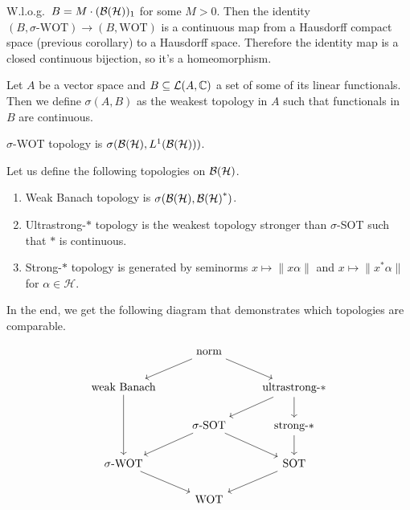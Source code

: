 \begin{myproof}
  W.l.o.g.~$B = M \cdot (\operatorname{\mathcal{B} (\mathcal{H})})_1$ for some $M > 0$. Then the identity $(B, \textrm{$\sigma$-WOT}) \to (B, \textrm{WOT})$
  is a continuous map from a Hausdorff compact space (previous corollary) to a Hausdorff space.
  Therefore the identity map is a closed continuous bijection, so it's a homeomorphism.
\end{myproof}

\begin{definition}
  Let $A$ be a vector space and $B \subseteq \mathcal{L} (A, \mathbb {C})$ a set of some of its linear functionals.
  Then we define $\sigma(A, B)$ as the weakest topology in $A$ such that functionals in $B$ are continuous. 
\end{definition}

\begin{remark}
  $\sigma$-WOT topology is $\sigma(\operatorname{\mathcal{B} (\mathcal{H})}, L^1 (\operatorname{\mathcal{B} (\mathcal{H})}))$.
\end{remark}

\begin{remark}
  Let us define the following topologies on $\operatorname{\mathcal{B} (\mathcal{H})}$.
  \begin{enumerate}
    \item Weak Banach topology is $\sigma(\operatorname{\mathcal{B} (\mathcal{H})}, \operatorname{\mathcal{B} (\mathcal{H})}^*)$.
    \item Ultrastrong-$*$ topology is the weakest topology stronger than $\sigma$-SOT such that $*$ is continuous.
    \item Strong-$*$ topology is generated by seminorms $x \mapsto \|x\alpha\|$ and $x \mapsto \|x^* \alpha\|$ for $\alpha \in \mathcal{H}$.
  \end{enumerate}
\end{remark}

In the end, we get the following diagram that demonstrates which topologies are comparable.

\[\begin{tikzcd}
	& {\textrm{norm}} \\
	{\textrm{weak Banach}} && {\textrm{ultrastrong-$*$}} \\
	& {\textrm{$\sigma$-SOT}} & {\textrm{strong-$*$}} \\
	{\textrm{$\sigma$-WOT}} && {\textrm{SOT}} \\
	& {\textrm{WOT}}
	\arrow[from=1-2, to=2-3]
	\arrow[from=1-2, to=2-1]
	\arrow[from=2-3, to=3-2]
	\arrow[from=2-3, to=3-3]
	\arrow[from=2-1, to=4-1]
	\arrow[from=3-2, to=4-1]
	\arrow[from=3-2, to=4-3]
	\arrow[from=3-3, to=4-3]
	\arrow[from=4-1, to=5-2]
	\arrow[from=4-3, to=5-2]
\end{tikzcd}\]